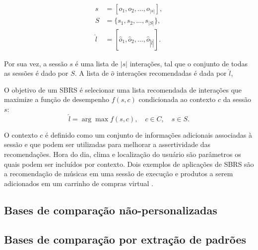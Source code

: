   \begin{equation*}
  \begin{aligned}
  s & = [o_1, o_2, \ldots, o_{|s|}], \\
  S & = \{s_1, s_2, \ldots, s_{|S|}\}, \\
  \hat{l} & = [\hat{o}_1, \hat{o}_2, \ldots, \hat{o}_{|\hat{l}|}].
  \end{aligned}
  \end{equation*}
  
    Por sua vez, a sessão $s$ é uma lista de
  $|s|$ interações, tal que o conjunto de todas as sessões é dado por $S$.
  A lista de $\hat{o}$ interações recomendadas é dada por $\hat{l}$,

  O objetivo de um SBRS é selecionar uma lista recomendada de interações
  que maximize a função de desempenho $f(s, c)$ condicionada ao contexto $c$ da
  sessão $s$:
  \[\hat{l} = \arg \max f(s, c), \quad c \in C, \quad s \in S.\]   

 O contexto $c$ é definido como um conjunto de informações adicionais associadas
  à sessão e que podem ser utilizadas para melhorar a assertividade das
  recomendações.  Hora do dia, clima e localização do usuário são parâmetros os
  quais podem ser incluídos por contexto. Dois exemplos de aplicações de SBRS
  são a recomendação de músicas em uma sessão de execução \cite{music_2013} e
  produtos a serem adicionados em um carrinho de compras virtual
  \cite{shopping_cart_2023}.

\subsection{Bases de comparação não-personalizadas}

\subsection{Bases de comparação por extração de padrões}